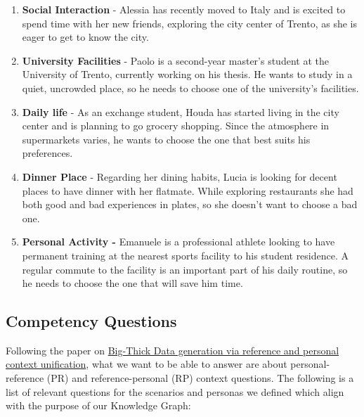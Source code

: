 \begin{enumerate}
    \item \textbf{Social Interaction} - Alessia has recently moved to Italy and is excited to spend time with her new friends, exploring the city center of Trento, as she is eager to get to know the city.
    \item \textbf{University Facilities} - Paolo is a second-year master's student at the University of Trento, currently working on his thesis. He wants to study in a quiet, uncrowded place, so he needs to choose one of the university's facilities.
    \item \textbf{Daily life} - As an exchange student, Houda has started living in the city center and is planning to go grocery shopping. Since the atmosphere in supermarkets varies, he wants to choose the one that best suits his preferences.
    \item \textbf{Dinner Place} - Regarding her dining habits, Lucia is looking for decent places to have dinner with her flatmate. While exploring restaurants she had both good and bad experiences in plates, so she doesn't want to choose a bad one.
    \item \textbf{Personal Activity - } Emanuele is a professional athlete looking to have permanent training at the nearest sports facility to his student residence. A regular commute to the facility is an important part of his daily routine, so he needs to choose the one that will save him time.
\end{enumerate}

\subsection{Competency Questions}
Following the paper on \href{https://arxiv.org/pdf/2409.05883}{Big-Thick Data generation via reference and personal context unification}, what we want to be able to answer are about personal-reference (PR) and reference-personal (RP) context questions.
The following is a list of relevant questions for the scenarios and personas we defined which align with the purpose of our Knowledge Graph:


